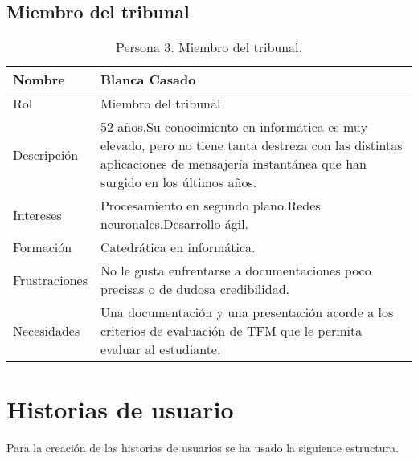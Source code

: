 \subsection{Miembro del tribunal}
\label{sec:personaMiembroTribunal}
\begin{table}[H]
    \centering
    \def\arraystretch{1.25}
    \begin{adjustbox}{max width=\textwidth}
    \begin{tabularx}{\textwidth}{l|L}
    \hline
        \textbf{Nombre} & \textbf{Blanca Casado} \\ \hline
    \hline
        Rol & Miembro del tribunal \\ \hline
        Descripción & 52 años.\linebreak Su conocimiento en informática es muy elevado, pero no tiene tanta destreza con las distintas aplicaciones de mensajería instantánea que han surgido en los últimos años. \\ \hline
        Intereses & Procesamiento en segundo plano.\linebreak Redes neuronales.\linebreak Desarrollo ágil. \\ \hline
        Formación & Catedrática en informática. \\ \hline
        Frustraciones & No le gusta enfrentarse a documentaciones poco precisas o de dudosa credibilidad. \\ \hline
        Necesidades & Una documentación y una presentación acorde a los criterios de evaluación de TFM que le permita evaluar al estudiante. \\ \hline
    \end{tabularx}
    \end{adjustbox}
    \caption{Persona 3. Miembro del tribunal.}
\end{table}

\section{Historias de usuario}

Para la creación de las historias de usuarios se ha usado la siguiente estructura.

